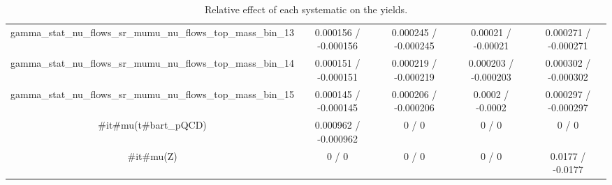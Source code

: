 \documentclass[10pt]{article}
\begin{document}
\begin{table}[htbp]
\begin{center}
\begin{tabular}{|c|c|c|c|c|}
  gamma_stat_nu_flows_sr_mumu_nu_flows_top_mass_bin_13 & 0.000156 / -0.000156 & 0.000245 / -0.000245 & 0.00021 / -0.00021 & 0.000271 / -0.000271 \\ 
  gamma_stat_nu_flows_sr_mumu_nu_flows_top_mass_bin_14 & 0.000151 / -0.000151 & 0.000219 / -0.000219 & 0.000203 / -0.000203 & 0.000302 / -0.000302 \\ 
  gamma_stat_nu_flows_sr_mumu_nu_flows_top_mass_bin_15 & 0.000145 / -0.000145 & 0.000206 / -0.000206 & 0.0002 / -0.0002 & 0.000297 / -0.000297 \\ 
  #it{#mu}(t#bar{t}_{pQCD}) & 0.000962 / -0.000962 & 0 / 0 & 0 / 0 & 0 / 0 \\ 
  #it{#mu}(Z) & 0 / 0 & 0 / 0 & 0 / 0 & 0.0177 / -0.0177 \\ 
\hline 
\end{tabular} 
\caption{Relative effect of each systematic on the yields.} 
\end{center} 
\end{table} 
\end{document}
